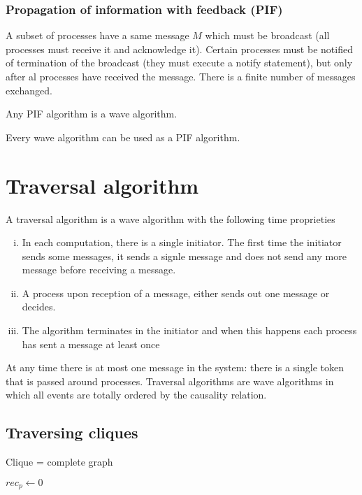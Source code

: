 \subsubsection{Propagation of information with feedback (PIF)}
A subset of processes have a same message $M$ which must be broadcast (all processes must receive it and acknowledge it). Certain processes must be notified of termination of the broadcast (they must execute a notify statement), but only after al processes have received the message. There is a finite number of messages exchanged.

\begin{thm}
Any PIF algorithm is a wave algorithm.
\end{thm}

\begin{thm}
Every wave algorithm can be used as a PIF algorithm.
\end{thm}

\section{Traversal algorithm}
\begin{defi}
A traversal algorithm is a wave algorithm with the following time proprieties
\begin{enumerate}[i.]
\item In each computation, there is a single initiator. The first time the initiator sends some messages, it sends a signle message and does not send any more message before receiving a message.
\item A process upon reception of a message, either sends out one message or decides.
\item The algorithm terminates in the initiator and when this happens each process has sent a message at least once
\end{enumerate}
\end{defi}

At any time there is at most one message in the system: there is a single token that is passed around processes. Traversal algorithms are wave algorithms in which all events are totally ordered by the causality relation.


\subsection{Traversing cliques}
Clique = complete graph


\begin{algorithm}
$rec_p \leftarrow 0$\\
\end{algorithm}


